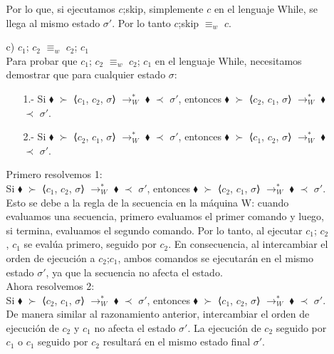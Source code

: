 \documentclass{article}
\begin{document}
\begin{itemize}
\begin{itemize}
            Por lo que, si ejecutamos $c$;{\sf skip}, simplemente $c$ en el lenguaje While, se llega al mismo estado $\sigma'$. Por lo tanto $c$;{\sf skip} $\equiv_w$ $c$.\\
            
            \item[c)] $c_1$; $c_2$ $\equiv_w$ $c_2$; $c_1$\\

            Para probar que $c_1$; $c_2$ $\equiv_w$ $c_2$; $c_1$ en el lenguaje While, necesitamos demostrar que para cualquier estado $\sigma$:

            \begin{itemize}
                \item[1.-] Si $\blacklozenge$ $\succ$  ⟨$c_1$, $c_2$, $\sigma$⟩ $\longrightarrow^{*}_{W}$ $\blacklozenge$ $\prec$ $\sigma'$, entonces $\blacklozenge$ $\succ$  ⟨$c_2$, $c_1$, $\sigma$⟩ $\longrightarrow^{*}_{W}$ $\blacklozenge$ $\prec$ $\sigma'$.

                \item[2.-] Si $\blacklozenge$ $\succ$  ⟨$c_2$, $c_1$, $\sigma$⟩ $\longrightarrow^{*}_{W}$ $\blacklozenge$ $\prec$ $\sigma'$, entonces $\blacklozenge$ $\succ$  ⟨$c_1$, $c_2$, $\sigma$⟩ $\longrightarrow^{*}_{W}$ $\blacklozenge$ $\prec$ $\sigma'$.\\
            \end{itemize}

            Primero resolvemos 1:\\

            Si $\blacklozenge$ $\succ$  ⟨$c_1$, $c_2$, $\sigma$⟩ $\longrightarrow^{*}_{W}$ $\blacklozenge$ $\prec$ $\sigma'$, entonces $\blacklozenge$ $\succ$  ⟨$c_2$, $c_1$, $\sigma$⟩ $\longrightarrow^{*}_{W}$ $\blacklozenge$ $\prec$ $\sigma'$. Esto se debe a la regla de la secuencia en la máquina W: cuando evaluamos una secuencia, primero evaluamos el primer comando y luego, si termina, evaluamos el segundo comando. Por lo tanto, al ejecutar $c_1$; $c_2$, $c_1$ se evalúa primero, seguido por $c_2$. En consecuencia, al intercambiar el orden de ejecución a $c_2$;$c_1$, ambos comandos se ejecutarán en el mismo estado $\sigma'$, ya que la secuencia no afecta el estado.\\

            Ahora resolvemos 2:\\

            Si $\blacklozenge$ $\succ$  ⟨$c_2$, $c_1$, $\sigma$⟩ $\longrightarrow^{*}_{W}$ $\blacklozenge$ $\prec$ $\sigma'$, entonces $\blacklozenge$ $\succ$  ⟨$c_1$, $c_2$, $\sigma$⟩ $\longrightarrow^{*}_{W}$ $\blacklozenge$ $\prec$ $\sigma'$. De manera similar al razonamiento anterior, intercambiar el orden de ejecución de $c_2$ y $c_1$ no afecta el estado $\sigma'$. La ejecución de $c_2$ seguido por $c_1$ o $c_1$ seguido por $c_2$ resultará en el mismo estado final $\sigma'$.\\


\end{itemize}
\end{itemize}
\end{document}
